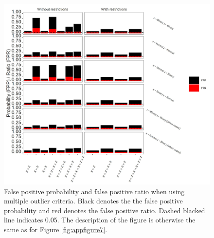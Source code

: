 \begin{figure}[hbt!]
\includegraphics[scale=0.95]{R/Analysis/Result/Figures/Figure1BSIBon.jpeg}
\centering
\caption{False positive probability and false positive ratio when using multiple outlier criteria. Black denotes the the false positive probability and red denotes the false positive ratio. Dashed blacked line indicates 0.05. The description of the figure is otherwise the same as for Figure \ref{fig:appfigure7}.
}
\label{fig:appfigure10}
\end{figure}

\begin{landscape}

\end{landscape}


